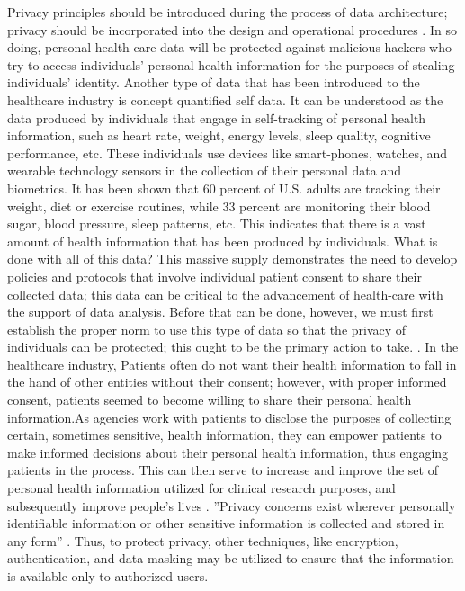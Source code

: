 \documentclass[sigconf]{acmart}
\begin{document}
Privacy principles should be introduced during the process of data architecture; privacy should be incorporated into the design and operational procedures \cite{cavoukian2012privacy}. In so doing, personal health care data will be protected against malicious hackers who try to access individuals' personal health information for the purposes of stealing individuals' identity. Another type of data that has been introduced to the healthcare industry is concept quantified self data. It can be understood as the data produced by individuals that engage in self-tracking of personal health information, such as heart rate, weight, energy levels, sleep quality, cognitive performance, etc. These individuals use devices like smart-phones, watches, and wearable technology sensors in the collection of their personal data and biometrics. It has been shown that 60 percent of U.S. adults are tracking their weight, diet or exercise routines, while 33 percent are monitoring their blood sugar, blood pressure, sleep patterns, etc. This indicates that there is a vast amount of health information that has been produced by individuals. What is done with all of this data? This massive supply demonstrates the need to develop policies and protocols that involve individual patient consent to share their collected data; this data can be critical to the advancement of health-care with the support of data analysis. Before that can be done, however, we must first establish the proper norm to use this type of data so that the privacy of individuals can be protected; this ought to be the primary action to take. \cite{swan2013quantified}.
In the healthcare industry, Patients often do not want their health information to fall in the hand of other entities without their consent; however, with proper informed consent, patients seemed to become willing to share their personal health information.As agencies work with patients to disclose the purposes of collecting certain, sometimes sensitive, health information, they can empower patients to make informed decisions about their personal health information, thus engaging patients in the process. This can then serve to increase and improve the set of personal health information utilized for clinical research purposes, and subsequently improve people's lives \cite{shelton2011electronic}. 
 ''Privacy concerns exist wherever personally identifiable information or other sensitive information is collected and stored in any form'' \cite{khan2016digital}. Thus, to protect privacy, other techniques, like encryption, authentication, and data masking may be utilized to ensure that the information is available only to authorized users.
 
\end{document}
